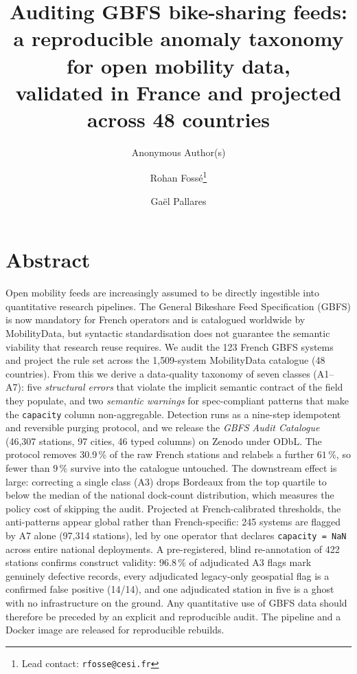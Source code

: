 \documentclass[11pt,a4paper]{article}
\title{\bfseries\sffamily\Large Auditing GBFS bike-sharing feeds:\\
a reproducible anomaly taxonomy for open mobility data,\\
validated in France and projected across 48 countries}
\author{Anonymous Author(s)}
\author[1]{Rohan Foss\'e\thanks{Lead contact: \texttt{rfosse@cesi.fr}}}
\author[2]{Ga\"el Pallares}
\affil[1]{CESI Engineering School, Montpellier, France}
\affil[2]{CESI LINEACT (EA 7527), Montpellier, France}
\date{}
\begin{document}
\maketitle

%

\section*{Abstract}
\noindent
Open mobility feeds are increasingly assumed to be directly ingestible
into quantitative research pipelines. The General Bikeshare Feed
Specification (GBFS) is now mandatory for French operators and is
catalogued worldwide by MobilityData, but syntactic standardisation does
not guarantee the semantic viability that research reuse requires. We
audit the 123 French GBFS systems and project the rule set across the
1{,}509-system MobilityData catalogue (48 countries). From this we derive
a data-quality taxonomy of seven classes (A1--A7): five \emph{structural
errors} that violate the implicit semantic contract of the field they
populate, and two \emph{semantic warnings} for spec-compliant patterns
that make the \texttt{capacity} column non-aggregable. Detection runs as a
nine-step idempotent and reversible purging protocol, and we release the
\emph{GBFS Audit Catalogue} (46{,}307 stations, 97 cities, 46 typed
columns) on Zenodo under ODbL. The protocol removes 30.9\,\% of
the raw French stations and relabels a further $61\,\%$, so fewer than
$9\,\%$ survive into the catalogue untouched. The downstream effect is
large: correcting a single class (A3) drops Bordeaux from the top quartile
to below the median of the national dock-count distribution, which measures
the policy cost of skipping the audit. Projected at French-calibrated thresholds, the anti-patterns appear
global rather than French-specific: 245 systems are flagged by A7 alone
(97{,}314 stations), led by one operator that declares
\texttt{capacity = NaN} across entire national deployments. A pre-registered, blind re-annotation of 422 stations confirms construct
validity: $96.8\,\%$ of adjudicated A3 flags mark genuinely defective
records, every adjudicated legacy-only geospatial flag is a confirmed
false positive (14/14), and one adjudicated station in five is a ghost
with no infrastructure on the ground. Any quantitative use of GBFS data should therefore be
preceded by an explicit and reproducible audit. The pipeline and a Docker
image are released for reproducible rebuilds.
\end{document}
